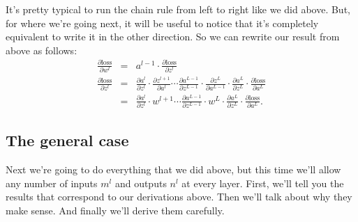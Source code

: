 



It's pretty typical to run the chain rule from left to right like we did above. But, for where we're going next, it will be useful to notice that it's completely equivalent to write it in the other direction. So we can rewrite our result from above as follows:
\begin{eqnarray}
  \label{eq:gradloss_oned}
  \frac{ \partial \text{loss} }{ \partial w^l }
  &=& a^{l-1} \cdot \frac{ \partial \text{loss} }{ \partial z^l } \\
  \label{eq:gradz_intermediate_oned}
  \frac{ \partial \text{loss} }{ \partial z^l }
  &=& \frac{ \partial a^{l} }{ \partial z^l }
  \cdot \frac{ \partial z^{l+1} }{ \partial a^{l} }
  \cdots
  \frac{ \partial a^{L-1} }{ \partial z^{L-1} }
  \cdot \frac{ \partial z^L }{ \partial a^{L-1} }
  \cdot \frac{ \partial a^L }{ \partial z^L }
  \cdot \frac{ \partial \text{loss} }{ \partial a^L } \\
  \label{eq:gradz_oned}
  &=& \frac{ \partial a^{l} }{ \partial z^l } \cdot w^{l+1}
  \cdots
  \frac{ \partial a^{L-1} }{ \partial z^{L-1} } \cdot w^L \cdot \frac{ \partial a^L }{ \partial z^L }
  \cdot \frac{ \partial \text{loss} }{ \partial a^L }.
\end{eqnarray}


\subsection{The general case}

Next we're going to do everything that we did above, but this time we'll allow any number of inputs $m^l$ and outputs $n^l$ at every layer. First, we'll tell you the results that correspond to our derivations above. Then we'll talk about why they make sense. And finally we'll derive them carefully.

